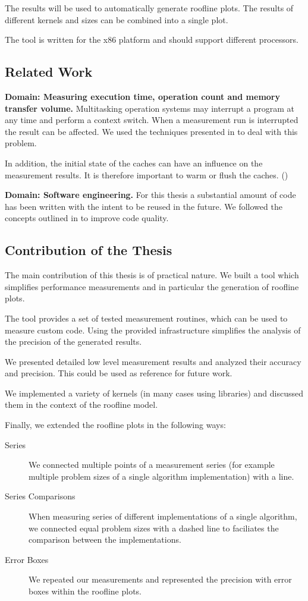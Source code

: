 \documentclass[a4paper,12pt]{article}
\begin{document}
The results will be used to automatically generate roofline plots. The
results of different kernels and sizes can be combined into a single plot.

The tool is written for the x86 platform and should support different
processors. 
 
\subsection{Related Work}
{\bf Domain: Measuring execution time, operation count and memory transfer
volume.} Multitasking operation systems may interrupt a program at any time and
perform a context switch. When a measurement run is interrupted the result can
be affected. We used the techniques presented in \cite{ComSysProgPersp} to deal
with this problem.

In addition, the initial state of the caches can have an influence on the
measurement results. It is therefore important to warm or flush the caches.
(\cite{Whaley:2008:AAC:1462062.1462065})

{\bf Domain: Software engineering.} For this thesis a substantial amount of code
has been written with the intent to be reused in the future. We followed the
concepts outlined in \cite{evans2004domain} to improve code quality.

\subsection{Contribution of the Thesis}
The main contribution of this thesis is of practical nature. We built a tool
which simplifies performance measurements and in particular the generation of
roofline plots.

The tool provides a set of tested measurement routines, which can be used
to measure custom code. Using the provided infrastructure simplifies the
analysis of the precision of the generated results.

We presented detailed low level measurement results and analyzed their accuracy
and precision. This could be used as reference for future work.

We implemented a variety of kernels (in many cases using libraries) and
discussed them in the context of the roofline model. 

Finally, we extended the roofline plots in the following ways: 
\begin{description}
\item[Series] We connected multiple points of a measurement series
(for example multiple problem sizes of a single algorithm implementation) with a line.
\item[Series Comparisons] When measuring series of different
implementations of a single algorithm, we connected equal problem sizes with a
dashed line to faciliates the comparison between the implementations.
\item[Error Boxes] We repeated our measurements and represented the precision
with error boxes within the roofline plots.
\end{description}
\end{document}
